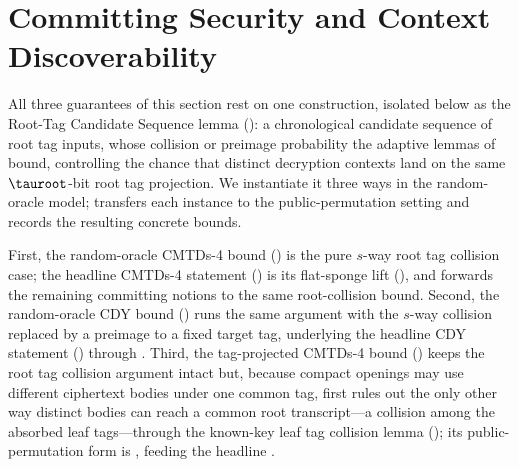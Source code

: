 \section{Committing Security and Context Discoverability}
\label{sec:cmtds3}

All three guarantees of this section rest on one construction, isolated
below as the Root-Tag Candidate Sequence lemma
(): a chronological candidate sequence of
root tag inputs, whose collision or preimage probability the adaptive
lemmas of  bound, controlling the chance that distinct
decryption contexts land on the same $\tauroot$-bit root tag projection.
We instantiate it three ways in the random-oracle model;
 transfers each instance to the
public-permutation setting and  records the resulting
concrete bounds.

First, the random-oracle CMTDs-4 bound () is the
pure $s$-way root tag collision case; the headline CMTDs-4 statement
() is its flat-sponge lift (), and
 forwards the remaining committing notions
to the same root-collision bound. Second, the random-oracle CDY
bound () runs the same argument with the $s$-way
collision replaced by a preimage to a fixed target tag, underlying the
headline CDY statement () through .
Third, the tag-projected CMTDs-4 bound () keeps
the root tag collision argument intact but, because compact openings may
use different ciphertext bodies under one common tag, first rules out the
only other way distinct bodies can reach a common root transcript---a
collision among the absorbed leaf tags---through the known-key leaf tag
collision lemma (); its
public-permutation form is , feeding the headline
.

